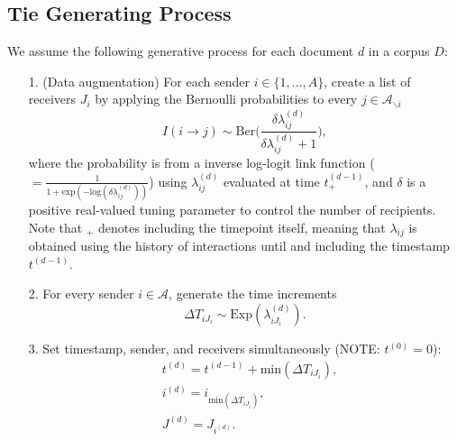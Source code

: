 \documentclass[a4paper]{article}
\begin{document}
\subsection{Tie Generating Process}\label{subsec: Tie Generating Process}
We assume the following generative process for each document $d$ in a corpus $D$:
\begin{itemize}
	\item[1.] (Data augmentation) For each sender $i \in \{1,...,A\}$, create a list of receivers $J_i$ by applying the Bernoulli probabilities to every $j \in \mathcal{A}_{\backslash i}$
	\begin{equation} I(i \rightarrow j) \sim \mbox{Ber}\Big(\frac{\delta\lambda^{(d)}_{ij}}{\delta\lambda^{(d)}_{ij}+1}\Big),
	\end{equation}
	where the probability is from a inverse log-logit link function ($=\frac{1}{1 + \mbox{exp}(-\mbox{log}(\delta\lambda^{(d)}_{ij}))}$) using $\lambda^{(d)}_{ij}$ evaluated at time $t_+^{(d-1)}$, and $\delta$ is a positive real-valued tuning parameter to control the number of recipients. Note that $_+$ denotes including the timepoint itself, meaning that $\lambda_{ij}$ is obtained using the history of interactions until and including the timestamp $t^{(d-1)}$. 
	\item[2.] For every sender $i \in \mathcal{A}$, generate the time increments \begin{equation}
\Delta T_{i{J_i}} \sim \mbox{Exp}(\lambda_{i{J_i}}^{(d)}).
	\end{equation}
	 	 \item[3.] Set timestamp, sender, and receivers simultaneously (NOTE: $t^{(0)}=0$):
	 	 \begin{equation}
	 	 \begin{aligned}
	 	 &t^{(d)} = t^{(d-1)}+\mbox{min}(\Delta T_{i{J_i}}),\\
	 	  &i^{(d)} = i_{\mbox{min}(\Delta T_{i{J_i}})}, \\
	 	  &J^{(d)} = J_{i^{(d)}}.
	 	  \end{aligned}
	 	 \end{equation}
\end{itemize}
\end{document}
